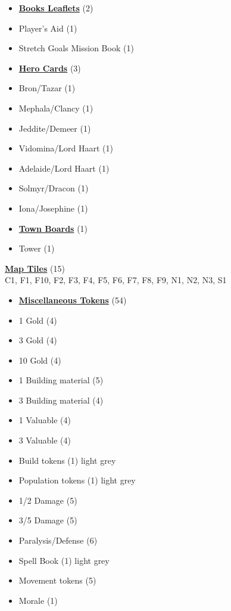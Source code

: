 
\begin{multicols}{3}

\small

\begin{itemize}[leftmargin=0pt, label={}, noitemsep, noitemsep]
  \item \textbf{\underline{Books Leaflets}} (2)
  \item Player's Aid (1)
  \item Stretch Goals Mission Book (1)
\end{itemize}

\begin{itemize}[leftmargin=0pt, label={}, noitemsep, noitemsep]
  \item \textbf{\underline{Hero Cards}} (3)
  \item Bron/Tazar (1)
  \item Mephala/Clancy (1)
  \item Jeddite/Demeer (1)
  \item Vidomina/Lord Haart (1)
  \item Adelaide/Lord Haart (1)
  \item Solmyr/Dracon (1)
  \item Iona/Josephine (1)
\end{itemize}

\begin{itemize}[leftmargin=0pt, label={}, noitemsep, noitemsep]
  \item \textbf{\underline{Town Boards}} (1)
  \item Tower (1)
\end{itemize}

\textbf{\underline{Map Tiles}} (15)\\
C1, F1, F10, F2, F3, F4, F5, F6, F7, F8, F9, N1, N2, N3, S1

\begin{itemize}[leftmargin=0pt, label={}, noitemsep, noitemsep]
  \item \textbf{\underline{Miscellaneous Tokens}} (54)
  \item 1 Gold (4)
  \item 3 Gold (4)
  \item 10 Gold (4)
  \item 1 Building material (5)
  \item 3 Building material (4)
  \item 1 Valuable (4)
  \item 3 Valuable (4)
  \item Build tokens (1) {light grey}
  \item Population tokens (1) {light grey}
  \item 1/2 Damage (5)
  \item 3/5 Damage (5)
  \item Paralysis/Defense (6)
  \item Spell Book (1) {light grey}
  \item Movement tokens (5)
  \item Morale (1)
\end{itemize}


\end{multicols}
